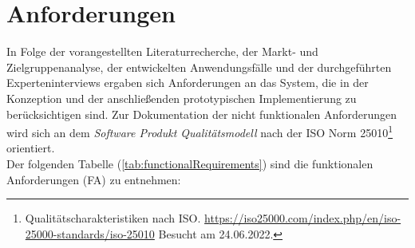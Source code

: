 \section{Anforderungen}
\label{sec:requirementsFinal}
    In Folge der vorangestellten Literaturrecherche, der Markt- und Zielgruppenanalyse, der entwickelten Anwendungsfälle und 
    der durchgeführten Experteninterviews ergaben sich Anforderungen an das System, 
    die in der Konzeption und der anschließenden prototypischen Implementierung zu berücksichtigen sind. 
    Zur Dokumentation der nicht funktionalen Anforderungen wird sich an dem 
    \textit{Software Produkt Qualitätsmodell} nach der ISO Norm 25010\footnote{Qualitätscharakteristiken nach ISO. \url{https://iso25000.com/index.php/en/iso-25000-standards/iso-25010} Besucht am 24.06.2022.} 
    orientiert. 
    \\
    Der folgenden Tabelle (\ref{tab:functionalRequirements}) sind die funktionalen Anforderungen (FA) zu entnehmen: 
